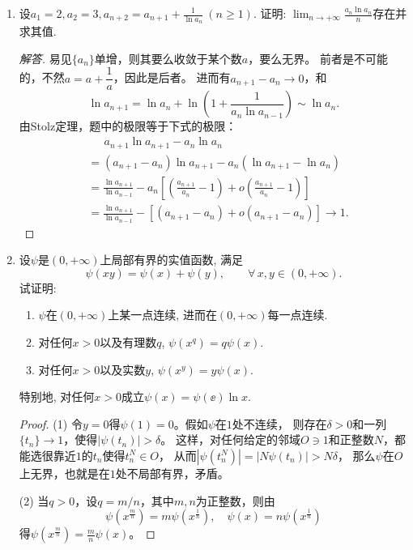 \begin{1a}
\begin{enumerate}
\begin{proof}[解答]
具体来讲，直接对两边取\(\arctan\)可得\[\arctan g(x+y)=\arctan\big(g(x)+g(y)\big),\]
即\[\operatorname{Im}G=\{G(x,y):x,y,x+y\in(-\delta,\delta)\}\subseteq\pi\Z,\]
其中\[G(x,y)=g(x+y)-g(x)-g(y).\]
由于\(\{(x,y):x,y,x+y\in(-\delta,\delta)\}\)是连通集而$G$连续，
得$\operatorname{Im}G$同样是连通集，
又\(0\in\operatorname{Im}G\)，只能\(\operatorname{Im}G=\{0\}\)。
\end{proof}
\item 设\(a_1=2,a_2=3,a_{n+2}=a_{n+1}+\frac{1}{\ln a_n}\ (n\geqslant 1)\). 
证明: \(\lim_{n\rightarrow+\infty}\frac{a_n\ln a_n}{n}\)存在并求其值.
\begin{proof}[解答]
易见\(\{a_n\}\)单增，则其要么收敛于某个数$a$，要么无界。
前者是不可能的，不然$a=a+\dfrac{1}{a}$，因此是后者。
进而有$a_{n+1}-a_n\to0$，和
\[\ln a_{n+1}=\ln a_n+\ln\left(1+\frac{1}{a_n\ln a_{n-1}}\right)\sim\ln a_n.\]
由Stolz定理，题中的极限等于下式的极限：
\begin{align*}
    &\quad\ \ a_{n+1}\ln a_{n+1}-a_n\ln a_n\\
    &=(a_{n+1}-a_n)\ln a_{n+1}-a_n(\ln a_{n+1}-\ln a_n)\\
    &=\frac{\ln a_{n+1}}{\ln a_{n-1}}-a_n\left[\left(\frac{a_{n+1}}{a_n}-1\right)+o\left(\frac{a_{n+1}}{a_n}-1\right)\right]\\
    &=\frac{\ln a_{n+1}}{\ln a_{n-1}}-[(a_{n+1}-a_n)+o(a_{n+1}-a_n)]\to1.
\end{align*}
\end{proof}
\item 设\(\psi\)是\((0,+\infty)\)上局部有界的实值函数, 满足
\[\psi(xy)=\psi(x)+\psi(y),\qquad\forall\, x,y\in(0,+\infty).\]
试证明:
\begin{enumerate}[label=(\arabic*)]
\item \(\psi\)在\((0,+\infty)\)上某一点连续, 进而在\((0,+\infty)\)每一点连续.
\item 对任何\(x>0\)以及有理数\(q\), \(\psi(x^q)=q\psi(x).\)
\item 对任何\(x>0\)以及实数\(y\), \(\psi(x^y)=y\psi(x).\)
\end{enumerate}
特别地, 对任何\(x>0\)成立\(\psi(x)=\psi(\ee)\ln x\).
\begin{proof}
    (1) 令$y=0$得$\psi(1)=0$。假如$\psi$在$1$处不连续，
    则存在$\delta>0$和一列$\{t_n\}\to1$，使得$|\psi(t_n)|>\delta$。
    这样，对任何给定的邻域$O\ni1$和正整数$N$，都能选很靠近$1$的$t_n$使得$t_n^N\in O$，
    从而$|\psi(t_n^N)|=|N\psi(t_n)|>N\delta$，
    那么$\psi$在$O$上无界，也就是在$1$处不局部有界，矛盾。

    (2) 当$q>0$，设$q=m/n$，其中$m,n$为正整数，则由
    \[\psi(x^\frac{m}{n})=m\psi(x^\frac{1}{n}),\quad\psi(x)=n\psi(x^\frac{1}{n})\]
    得$\psi(x^\frac{m}{n})=\frac{m}{n}\psi(x)$。


\end{proof}
\end{enumerate}
\end{1a}
